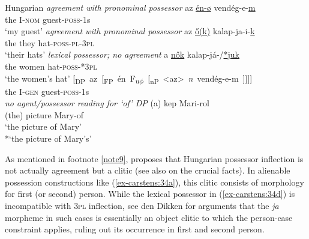 \documentclass[output=paper
,modfonts
,nonflat]{langsci/langscibook}
\begin{document}
\begin{exe}
	\ex Hungarian \citep[90]{Szabolcsi1983} \label{ex-carstens:34}
	\xlist
	\ex\label{ex-carstens:34a} \textit{agreement with pronominal possessor} \newline
	\gll az   \underline{én-ø} vendég-e-\underline{m}\\
	the I-\textsc{nom} guest-\textsc{poss}{}-1s\\
	\glt `my guest'  	
	\ex \textit{agreement with pronominal possessor} \newline
	\gll az   \underline{\H{o}(k)}  kalap-ja-i-\underline{k}\\
	the they hat-\textsc{poss}{}-\textsc{pl}{}-\textsc{3pl}\\
	\glt `their hats'
	\ex \textit{lexical possessor; no agreement}\newline
	\gll  a   \underline{n\H{o}k}       kalap-já-/\underline{*juk}\\
	the   women hat-\textsc{poss}{}-*\textsc{3pl}\\
	\glt `the women's hat' 
	\ex \label{ex-carstens:34d}
	\gll \mbox{[\textsubscript{DP} az [\textsubscript{FP} én    F\textsubscript{u}\textsubscript{$\phi$} [\textsubscript{nP} <az> \textit{n} vendég-e-m ]]]]}\\
	\hspace{0.6cm}the      \hspace{-5.4cm}I-\textsc{gen}                     \hspace{-2.7cm}guest-\textsc{poss}-1s\\
	\ex \textit{no agent/possessor reading for `of' DP} \newline
	\gll (a) kep       Mari-rol\\
	(the) picture Mary-of\\
	\glt `the picture of Mary'\\ {*}`the picture of Mary's'
	\endxlist
\end{exe}
As mentioned in footnote \ref{note9}, \citet{Den_Dikken2015} proposes that Hungarian possessor inflection is not actually agreement but a clitic (see also \citealt{Bartos1999,Den_Dikken1999,Kiss2002} on the crucial facts). In alienable possession constructions like (\ref{ex-carstens:34a}), this clitic consists of morphology for first (or second) person. While the lexical possessor in (\ref{ex-carstens:34d}) is incompatible with \textsc{3pl} inflection, see den Dikken for arguments that the \textit{ja} morpheme in such cases is essentially an object clitic to which the person-case constraint applies, ruling out its occurrence in first and second person. 
\end{document}
